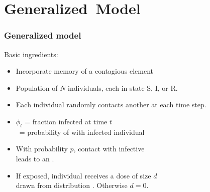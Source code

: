 %

\section{Generalized\ Model}


\begin{frame}
  \frametitle{Generalized model}

  \begin{block}{Basic ingredients:}
    \begin{itemize}
    \item<1-> Incorporate memory of a contagious element\cite{dodds2004a,dodds2005a}
    \item<2-> Population of $N$ individuals, each in state S, I, or R.
    \item<3-> Each individual randomly contacts another at each time step.
    \item<4-> $\phi_t$ = fraction infected at time $t$ \\
      \quad \quad \ = probability of \underline{} with infected individual
    \item<5-> With probability $p$, contact with infective\\
      \quad leads to an \underline{}.
    \item<6-> If exposed, individual receives a dose of size $d$\\
      \quad  drawn from distribution .  Otherwise $d=0$.
    \end{itemize}
  \end{block}

\end{frame}



